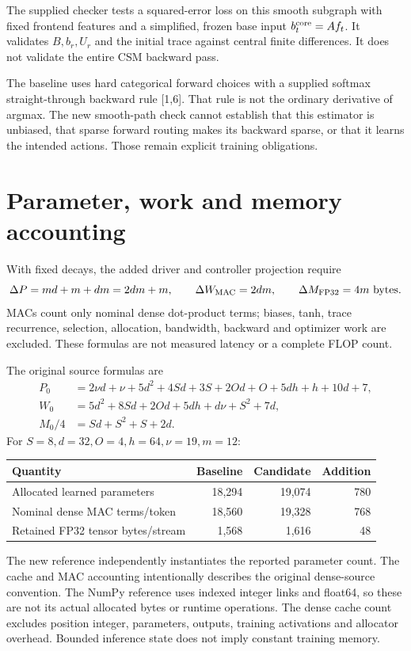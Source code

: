 \documentclass[11pt,a4paper]{article}
\begin{document}
The supplied checker tests a squared-error loss on this smooth subgraph with
fixed frontend features and a simplified, frozen base input \(b_t^{\rm core}=Af_t\).
It validates \(B,b_r,U_r\) and the initial trace against
central finite differences. It does not validate the entire CSM backward pass.

The baseline uses hard categorical forward choices with a supplied softmax
straight-through backward rule [1,6]. That rule is not the ordinary derivative
of argmax. The new smooth-path check cannot establish that this estimator is
unbiased, that sparse forward routing makes its backward sparse, or that it
learns the intended actions. Those remain explicit training obligations.

\section{Parameter, work and memory accounting}
With fixed decays, the added driver and controller projection require
\begin{equation}
\Delta P=md+m+dm=2dm+m,\qquad
\Delta W_{\rm MAC}=2dm,\qquad \Delta M_{\rm FP32}=4m\ \text{bytes}.
\end{equation}
MACs count only nominal dense dot-product terms; biases, tanh, trace recurrence,
selection, allocation, bandwidth, backward and optimizer work are excluded.
These formulas are not measured latency or a complete FLOP count.

The original source formulas are
\begin{align*}
P_0&=2\nu d+\nu+5d^2+4Sd+3S+2Od+O+5dh+h+10d+7,\\
W_0&=5d^2+8Sd+2Od+5dh+d\nu+S^2+7d,\\
M_0/4&=Sd+S^2+S+2d.
\end{align*}
For \(S=8,d=32,O=4,h=64,\nu=19,m=12\):
\begin{center}
\begin{tabular}{lrrr}
\toprule
Quantity & Baseline & Candidate & Addition\\ \midrule
Allocated learned parameters & 18,294 & 19,074 & 780\\
Nominal dense MAC terms/token & 18,560 & 19,328 & 768\\
Retained FP32 tensor bytes/stream & 1,568 & 1,616 & 48\\
\bottomrule
\end{tabular}
\end{center}
The new reference independently instantiates the reported parameter count.
The cache and MAC accounting intentionally describes the original dense-source
convention. The NumPy reference uses indexed integer links and float64, so these
are not its actual allocated bytes or runtime operations. The dense cache count
excludes position integer, parameters, outputs, training activations and allocator
overhead. Bounded inference state does not imply constant training memory.
\end{document}
